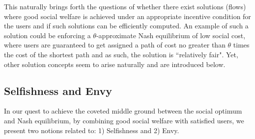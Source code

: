 This naturally brings forth the questions of whether there exist solutions (flows) where good social welfare is achieved under an appropriate incentive condition for the users %
and if such solutions can be efficiently computed. 
An example of such a solution could be enforcing a $\theta$-approximate Nash equilibrium of low social cost,  where users are guaranteed to get assigned a path of cost no greater than $\theta$ times the cost of the shortest path and as such, the solution is ``relatively fair". 
Yet, other solution concepts seem to arise naturally and are introduced below.%

 



\subsection{Selfishness and Envy}
In our quest to achieve the coveted middle ground between the social optimum and Nash equilibrium, by combining good social welfare with satisfied users, we present two notions related to: 1) Selfishness and 2) Envy. 

